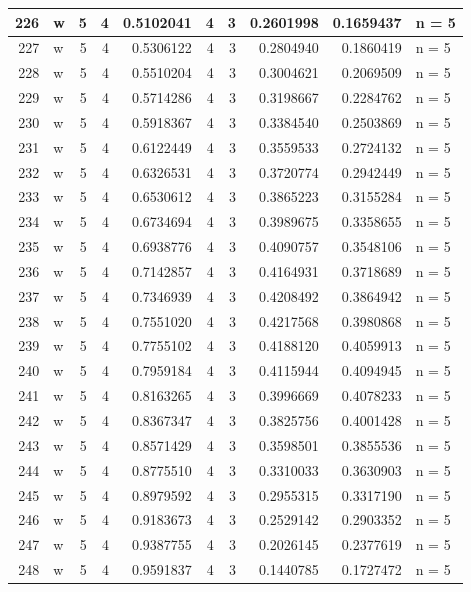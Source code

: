 \documentclass[
  letterpaper,
  DIV=11,
  numbers=noendperiod]{scrreprt}
\begin{document}
\begin{table}
\begin{tabular}[t]{r|l|r|r|r|r|r|r|r|l}
\hline
226 & w & 5 & 4 & 0.5102041 & 4 & 3 & 0.2601998 & 0.1659437 & n = 5\\
\hline
227 & w & 5 & 4 & 0.5306122 & 4 & 3 & 0.2804940 & 0.1860419 & n = 5\\
\hline
228 & w & 5 & 4 & 0.5510204 & 4 & 3 & 0.3004621 & 0.2069509 & n = 5\\
\hline
229 & w & 5 & 4 & 0.5714286 & 4 & 3 & 0.3198667 & 0.2284762 & n = 5\\
\hline
230 & w & 5 & 4 & 0.5918367 & 4 & 3 & 0.3384540 & 0.2503869 & n = 5\\
\hline
231 & w & 5 & 4 & 0.6122449 & 4 & 3 & 0.3559533 & 0.2724132 & n = 5\\
\hline
232 & w & 5 & 4 & 0.6326531 & 4 & 3 & 0.3720774 & 0.2942449 & n = 5\\
\hline
233 & w & 5 & 4 & 0.6530612 & 4 & 3 & 0.3865223 & 0.3155284 & n = 5\\
\hline
234 & w & 5 & 4 & 0.6734694 & 4 & 3 & 0.3989675 & 0.3358655 & n = 5\\
\hline
235 & w & 5 & 4 & 0.6938776 & 4 & 3 & 0.4090757 & 0.3548106 & n = 5\\
\hline
236 & w & 5 & 4 & 0.7142857 & 4 & 3 & 0.4164931 & 0.3718689 & n = 5\\
\hline
237 & w & 5 & 4 & 0.7346939 & 4 & 3 & 0.4208492 & 0.3864942 & n = 5\\
\hline
238 & w & 5 & 4 & 0.7551020 & 4 & 3 & 0.4217568 & 0.3980868 & n = 5\\
\hline
239 & w & 5 & 4 & 0.7755102 & 4 & 3 & 0.4188120 & 0.4059913 & n = 5\\
\hline
240 & w & 5 & 4 & 0.7959184 & 4 & 3 & 0.4115944 & 0.4094945 & n = 5\\
\hline
241 & w & 5 & 4 & 0.8163265 & 4 & 3 & 0.3996669 & 0.4078233 & n = 5\\
\hline
242 & w & 5 & 4 & 0.8367347 & 4 & 3 & 0.3825756 & 0.4001428 & n = 5\\
\hline
243 & w & 5 & 4 & 0.8571429 & 4 & 3 & 0.3598501 & 0.3855536 & n = 5\\
\hline
244 & w & 5 & 4 & 0.8775510 & 4 & 3 & 0.3310033 & 0.3630903 & n = 5\\
\hline
245 & w & 5 & 4 & 0.8979592 & 4 & 3 & 0.2955315 & 0.3317190 & n = 5\\
\hline
246 & w & 5 & 4 & 0.9183673 & 4 & 3 & 0.2529142 & 0.2903352 & n = 5\\
\hline
247 & w & 5 & 4 & 0.9387755 & 4 & 3 & 0.2026145 & 0.2377619 & n = 5\\
\hline
248 & w & 5 & 4 & 0.9591837 & 4 & 3 & 0.1440785 & 0.1727472 & n = 5\\

\end{tabular}
\end{table}
\end{document}
